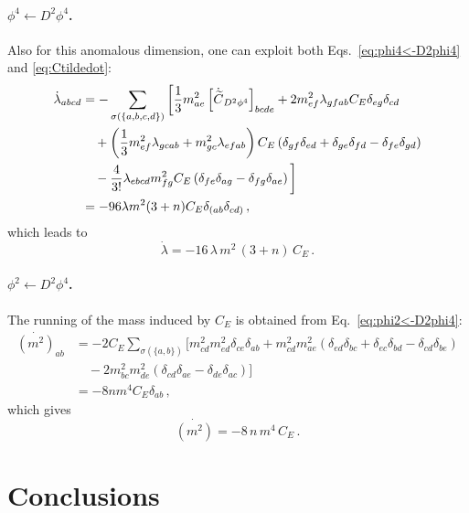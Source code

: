 \paragraph{\texorpdfstring{$\phi^4 \leftarrow D^2\phi^4$}{phi4fromD2phi4}.}
Also for this anomalous dimension, one can exploit both Eqs.~\eqref{eq:phi4<-D2phi4} and \eqref{eq:Ctildedot}:
\begin{align}
    \dot \lambda_{abcd} &=- \sum_{\sigma(\{a,b,c,d\})} \bigg[ 
    \frac{1}{3}  m^2_{ae}\left[\dot{\widetilde{C}}_{D^2\phi^4}\right]_{bcde} +  2 m^2_{ef}\lambda_{gfab}C_E\delta_{eg}\delta_{cd}\nonumber \\
    &\quad +\left(\frac{1}{3}m^2_{ef}\lambda_{gcab}+m^2_{gc}\lambda_{efab}\right)C_E\left(\delta_{gf}\delta_{ed}+\delta_{ge}\delta_{fd}-\delta_{fe}\delta_{gd}\right)\nonumber \\
    &\quad - \frac{4}{3!} \lambda_{ebcd} m^2_{fg}C_E \left(\delta_{fe}\delta_{ag}-\delta_{fg}\delta_{ae}\right)\bigg]\nonumber \\
    &= -96 \lambda m^2 (3+n) C_E \delta_{(ab}\delta_{cd)} \,,
\end{align}
which leads to
\begin{equation}
    \dot \lambda = -16\, \lambda\, m^2\, (3+n)\, C_E\,.
\end{equation}

\paragraph{\texorpdfstring{$\phi^2 \leftarrow D^2\phi^4$}{phi2fromD2phi4}.}
The running of the mass induced by $C_E$ is obtained from Eq.~\eqref{eq:phi2<-D2phi4}:
\begin{align}
    \dot {(m^2)}_{ab} &= -2 C_E \sum_{\sigma(\{a,b\})} \Big[
    m^2_{cd}m^2_{ed} \delta_{ce}\delta_{ab}+m^2_{cd}m^2_{ae}(\delta_{ed}\delta_{bc}+\delta_{ec}\delta_{bd}-\delta_{cd}\delta_{be})
    \nonumber \\
    &\quad -2  m^2_{bc} m^2_{de} \left(\delta_{cd}\delta_{ae}-\delta_{de}\delta_{ac}\right) \Big]\nonumber \\
    &= -8 n m^4 C_E \delta_{ab}\,,
\end{align}
which gives
\begin{equation}
    \dot {(m^2)} = -8\, n\, m^4\, C_E\,.
\end{equation}

\section{Conclusions}
\label{sec:gEFTconclusions}

